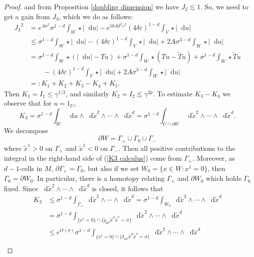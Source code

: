 \documentclass[reqno,12pt,letterpaper]{amsart}
\newcommand*\dif{\mathop{}\!\mathrm{d}}
\theoremstyle{definition}
\numberwithin{equation}{section}
\begin{document}
\begin{proof}
and from Proposition \ref{doubling dimension} we have $J_2 \lesssim 1$.
So, we need to get a gain from $J_3$, which we do as follows:
\begin{align*}
{J_3}^2 &= e^{A\sigma^2} \sigma^{1 - d} \int_W \star |\dif u| - e^{16A\delta^2 \varepsilon^2} (4\delta\varepsilon)^{1 - d} \int_V \star |\dif u| \\
&\leq \sigma^{1 - d} \int_W \star |\dif u| - (4 \delta \varepsilon)^{1 - d} \int_V \star |\dif u| + 2A\sigma^{3 - d} \int_W \star |\dif u| \\
&= \sigma^{1 - d} \int_W \star (|\dif u| - Tu) + \sigma^{1 - d} \int_W \star (Tu - \tilde Tu) + \sigma^{1 - d} \int_W \star \tilde Tu \\
&\qquad - (4 \delta\varepsilon)^{1 - d} \int_V \star |\dif u| + 2A \sigma^{3 - d} \int_W \star |\dif u| \\
&=: K_1 + K_2 + K_3 - K_4 + K_5.
\end{align*}
Then $K_1 = I_1 \leq \gamma^{1/2}$, and similarly $K_2 = I_2 \lesssim \gamma^{2p}$.
To estimate $K_3 - K_4$ we observe that for $u = 1_U$,
\begin{equation}\label{K3 calculus}
K_3 = \sigma^{1 - d} \int_W \dif u \wedge \dif \tilde x^2 \wedge \cdots \wedge \dif \tilde x^d = \sigma^{1 - d} \int_{U \cap \partial W} \dif \tilde x^2 \wedge \cdots \wedge \dif \tilde x^d.
\end{equation}
We decompose
$$\partial W = \Gamma_+ \cup \Gamma_0 \cup \Gamma_-$$
where $\tilde x^1 > 0$ on $\Gamma_+$ and $\tilde x^1 < 0$ on $\Gamma_-$. Then all positive contributions to the integral in the right-hand side of (\ref{K3 calculus}) come from $\Gamma_+$.
Moreover, as $d-1$-cells in $M$, $\partial \Gamma_+ = \Gamma_0$, but also if we set $W_0 = \{x \in W: x^1 = 0\}$, then $\Gamma_0 = \partial W_0$.
In particular, there is a homotopy relating $\Gamma_+$ and $\partial W_0$ which holds $\Gamma_0$ fixed.
Since $\dif \tilde x^2 \wedge \cdots \wedge \dif \tilde x^d$ is closed, it follows that
\begin{align*}
K_3 &\leq \sigma^{1 - d} \int_{\Gamma_+} \dif \tilde x^2 \wedge \cdots \wedge \dif \tilde x^d = \sigma^{1 - d} \int_{W_0} \dif \tilde x^2 \wedge \cdots \wedge \dif \tilde x^d\\
& = \sigma^{1 - d} \int_{\{x^1 = 0\} \cap \{\tilde g_{\mu\nu} \tilde x^\mu \tilde x^\nu = \sigma\}} \dif \tilde x^2 \wedge \cdots \wedge \dif \tilde x^d\\
&\leq e^{O(\sigma)} \sigma^{1 - d} \int_{\{x^1 = 0\} \cap \{\delta_{\mu\nu} \tilde x^\mu \tilde x^\nu = \sigma\}} \dif \tilde x^2 \wedge \cdots \wedge \dif \tilde x^d\\

\end{align*}
\end{proof}
\end{document}
